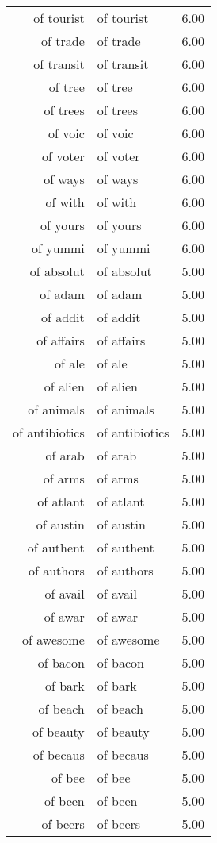 \begin{table}[ht]
\begin{tabular}{rlr}
  of tourist & of tourist & 6.00 \\ 
  of trade & of trade & 6.00 \\ 
  of transit & of transit & 6.00 \\ 
  of tree & of tree & 6.00 \\ 
  of trees & of trees & 6.00 \\ 
  of voic & of voic & 6.00 \\ 
  of voter & of voter & 6.00 \\ 
  of ways & of ways & 6.00 \\ 
  of with & of with & 6.00 \\ 
  of yours & of yours & 6.00 \\ 
  of yummi & of yummi & 6.00 \\ 
  of absolut & of absolut & 5.00 \\ 
  of adam & of adam & 5.00 \\ 
  of addit & of addit & 5.00 \\ 
  of affairs & of affairs & 5.00 \\ 
  of ale & of ale & 5.00 \\ 
  of alien & of alien & 5.00 \\ 
  of animals & of animals & 5.00 \\ 
  of antibiotics & of antibiotics & 5.00 \\ 
  of arab & of arab & 5.00 \\ 
  of arms & of arms & 5.00 \\ 
  of atlant & of atlant & 5.00 \\ 
  of austin & of austin & 5.00 \\ 
  of authent & of authent & 5.00 \\ 
  of authors & of authors & 5.00 \\ 
  of avail & of avail & 5.00 \\ 
  of awar & of awar & 5.00 \\ 
  of awesome & of awesome & 5.00 \\ 
  of bacon & of bacon & 5.00 \\ 
  of bark & of bark & 5.00 \\ 
  of beach & of beach & 5.00 \\ 
  of beauty & of beauty & 5.00 \\ 
  of becaus & of becaus & 5.00 \\ 
  of bee & of bee & 5.00 \\ 
  of been & of been & 5.00 \\ 
  of beers & of beers & 5.00 \\ 

\end{tabular}
\end{table}
